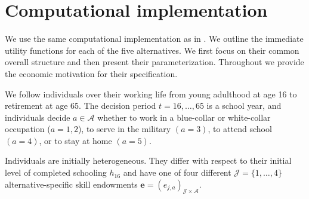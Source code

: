 \section{Computational implementation}\label{Computational implementation}
We use the same computational implementation as in \citet{Keane.1997}. We outline the immediate utility functions for each of the five alternatives. We first focus on their common overall structure and then present their parameterization. Throughout we provide the economic motivation for their specification.

We follow individuals over their working life from young adulthood at age 16 to retirement at age 65. The decision period $t = 16, \dots, 65$  is a school year, and individuals decide $a\in\mathcal{A}$ whether to work in a blue-collar or white-collar occupation ($a = 1, 2$), to serve in the military $(a = 3)$, to attend school $(a = 4)$, or to stay at home $(a = 5)$.

Individuals are initially heterogeneous. They differ with respect to their initial level of completed schooling $h_{16}$ and have one of four different $\mathcal{J} = \{1, \hdots, 4\}$ alternative-specific skill endowments $\bm{e} = \left(e_{j,a}\right)_{\mathcal{J} \times \mathcal{A}}$.

